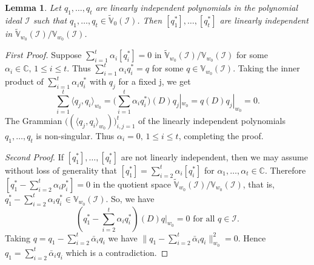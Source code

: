 \documentclass[11pt]{amsart}
\newtheorem{lem}[thm]{Lemma}
\theoremstyle{definition}
\numberwithin{equation}{section}
\begin{document}
\begin{lem}\label{sc}
Let $q_1,\ldots, q_t$ are linearly independent polynomials in the polynomial ideal $\mathcal I$ such that $q_1,\ldots, q_t\in \tilde{\mathbb V}_{0}(\mathcal I)$. Then $[q_1^*],\ldots,[q_t^*]$ are linearly independent in 
$\tilde{\mathbb V}_{w_0}(\mathcal I)/\mathbb V_{w_0}(\mathcal I)$.
\end{lem}
\begin{proof}[First Proof]
Suppose $\sum_{i=1}^t \alpha_i [q_i^*] = 0$ in $\tilde{\mathbb V}_{w_0}(\mathcal I)/\mathbb V_{w_0}(\mathcal I)$ for some $\alpha_i\in{{\mathbb C}},\,1\leq i\leq t$. Thus $\sum_{i=1}^t \alpha_i q_i^* = q$ for some $q\in \mathbb V_{w_0}(\mathcal I)$. Taking the inner product of $\sum_{i=1}^t \alpha_i q_i^*$ with $q_j$ for a fixed j, we get
$$
\sum_{i=1}^t \langle q_j, q_i \rangle_{w_0} =\big( \sum_{i=1}^t \alpha_i q_i^*\big)(D)q_j|_{w_0}= q(D)q_j|_{w_0}= 0.
$$
The Grammian $\big(\!(\langle q_j, q_i \rangle_{w_0})\!\big)_{i,j=1}^t$ of the linearly independent polynomials $q_1,\ldots, q_t$ is non-singular. Thus $\alpha_i=0,\,1\leq i\leq t$, completing the proof.

\noindent\textit{Second Proof}. If $[q_1^*],\ldots,[q_t^*]$ are not linearly independent, then we may assume without loss of generality that $[q_1^*] =\sum_{i=2}^t\alpha_i [q_i^*]$ for $\alpha_1,\ldots,\alpha_t\in{{\mathbb C}}$. Therefore $[q_1^*  - \sum_{i=2}^t\alpha_i p_i^*] = 0$ in the quotient space $\tilde{\mathbb V}_{w_0}(\mathcal I)/\mathbb V_{w_0}(\mathcal I)$, that is, $q_1^*  - \sum_{i=2}^t\alpha_i q_i^* \in \mathbb V_{w_0}(\mathcal I)$. So, we have
$$
(q_1^*  - \sum_{i=2}^t\alpha_i q_i^*)(D)q|_{w_0}=0 \mbox{~for~all~} q\in\mathcal I.
$$
Taking $q=q_1  - \sum_{i=2}^t\bar\alpha_i q_i $ we have $\parallel q_1  - \sum_{i=2}^t\bar\alpha_i q_i\parallel_{w_0}^2 = 0$. Hence $q_1  = \sum_{i=2}^t\bar\alpha_i q_i$ which is a contradiction.
\end{proof}
\end{document}
